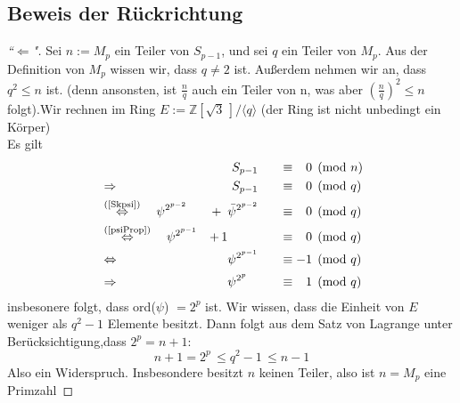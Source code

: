 \documentclass{article}
\newcommand{\Integer}{\ensuremath{\mathbb{Z}}}
\begin{document}
\subsection{Beweis der R\"{u}ckrichtung}
\begin{proof}[``$\Leftarrow$"]
Sei $n := M_p$ ein Teiler von $S_{p-1}$, und sei $q$ ein Teiler von $M_p$.
Aus der Definition von $M_p$ wissen wir, dass $q\neq2$ ist. Au\ss erdem nehmen wir an, dass $q^2 \leq n$ ist. (denn ansonsten, ist $\frac{n}{q}$ auch ein Teiler von n, was aber $(\frac{n}{q})^2 \leq n$ folgt).Wir rechnen im Ring $E  := \Integer[\sqrt{3}\,]/\langle q \rangle$ (der Ring ist nicht unbedingt ein K\"{o}rper)\\
Es gilt %
\begin{alignat*}{4}
	&\phantom{\Rightarrow a} & S_{p-1} \quad &&\equiv{\phantom{-}0} &\pmod{n} \\
	&\Rightarrow &S_{p-1} 		\quad   &&\equiv{\phantom{-}0} &\pmod{q}\\
	&\overset{\text{(\ref{Skpsi})}}{\Leftrightarrow} \quad \psi^{2^{p-2}} &+ \phantom{1}\bar{\psi}^{2^{p-2}} \quad &&\equiv{\phantom{-}0} &\pmod{q}\\
	&\overset{\text{(\ref{psiProp})}}{\Leftrightarrow} \quad \psi^{2^{p-1}} &+ \,1 \phantom{\bar{\psi}^{2^{p-2}}} \quad &&\equiv{\phantom{-}0}  &\pmod{q}\\
	&\Leftrightarrow &\psi^{2^{p-1}} \quad &&\equiv{-1} &\pmod{q}\\
	&\Rightarrow &\psi^{2^{p\phantom{-1}}} \quad && \equiv{\phantom{-}1} &\pmod{q}
\end{alignat*}
insbesonere folgt, dass ord($\psi$) $ = 2^p$ ist. Wir wissen, dass die Einheit von $E$ weniger als $q^2 - 1$ Elemente besitzt. Dann folgt aus dem Satz von Lagrange unter Ber\"{u}cksichtigung,dass $2^{p} = n + 1$:
\[
	n + 1 = 2^{p} \,\leq q^2-1 \,\leq n - 1
\]
Also ein Widerspruch. Insbesondere besitzt $n$ keinen Teiler, also ist $n = M_p$ eine Primzahl
\end{proof}
\end{document}

